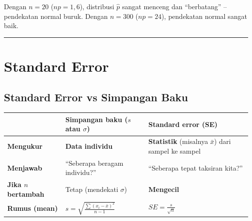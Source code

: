 \documentclass[
  indonesian,
  letterpaper,
]{book}
\newcounter{none} %
\begin{document}
Dengan \(n = 20\) (\(np = 1{,}6\)), distribusi \(\hat{p}\) sangat
menceng dan ``berbatang'' -- pendekatan normal buruk. Dengan \(n = 300\)
(\(np = 24\)), pendekatan normal sangat baik.

\begin{center}\rule{0.5\linewidth}{0.5pt}\end{center}


\chapter{Standard Error}\label{standard-error}

\section{Standard Error vs Simpangan
Baku}\label{standard-error-vs-simpangan-baku}

{\def\LTcaptype{none} %
\begin{longtable}[]{@{}
  >{\raggedright\arraybackslash}p{}
  >{\raggedright\arraybackslash}p{}
  >{\raggedright\arraybackslash}p{}@{}}
\toprule\noalign{}
\begin{minipage}[b]{\linewidth}\raggedright
\end{minipage} & \begin{minipage}[b]{\linewidth}\raggedright
\textbf{Simpangan baku} (\(s\) atau \(\sigma\))
\end{minipage} & \begin{minipage}[b]{\linewidth}\raggedright
\textbf{Standard error (SE)}
\end{minipage} \\
\midrule\noalign{}
\endhead
\bottomrule\noalign{}
\endlastfoot
\textbf{Mengukur} & \textbf{Data individu} & \textbf{Statistik}
(misalnya \(\bar{x}\)) dari sampel ke sampel \\
\textbf{Menjawab} & ``Seberapa beragam individu?'' & ``Seberapa tepat
taksiran kita?'' \\
\textbf{Jika \(n\) bertambah} & Tetap (mendekati \(\sigma\)) &
\textbf{Mengecil} \\
\textbf{Rumus (mean)} & \(s = \sqrt{\frac{\sum (x_i-\bar{x})^2}{n-1}}\)
& \(SE = \frac{s}{\sqrt{n}}\) \\
\end{longtable}
}
\end{document}
